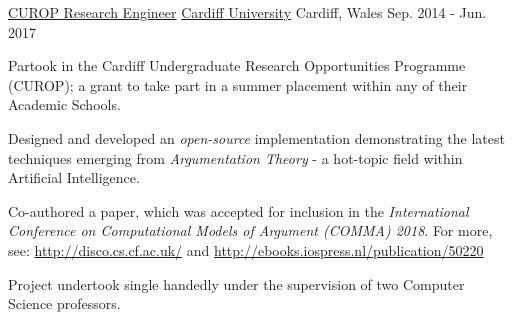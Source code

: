 \begin{cventries}
  \cventry
    {\href{https://www.cardiff.ac.uk/study/undergraduate/why-study-with-us/leaders-in-research/research-opportunities}{CUROP Research Engineer}} %
    {\href{https://www.cardiff.ac.uk/}{Cardiff University}} %
    {Cardiff, Wales} %
    {Sep. 2014 - Jun. 2017} %
    {
      \begin{cvitems} %
        \item Partook in the Cardiff Undergraduate Research Opportunities Programme (CUROP); a grant to take part in a summer placement within any of their Academic Schools.
        \item Designed and developed an \textit{open-source} implementation demonstrating the latest techniques emerging from \textit{Argumentation Theory} - a hot-topic field within Artificial Intelligence.         
        \item Co-authored a paper, which was accepted for inclusion in the \textit{International Conference on Computational Models of Argument (COMMA) 2018}. For more, see: \url{http://disco.cs.cf.ac.uk/} and \url{http://ebooks.iospress.nl/publication/50220}
        \item Project undertook single handedly under the supervision of two Computer Science professors.
      \end{cvitems}
    }
    {}


\end{cventries}
